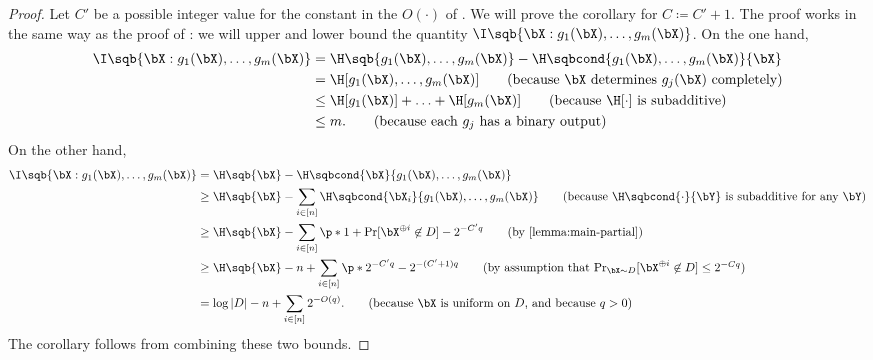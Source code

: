 \begin{proof}
Let $C'$ be a possible integer value for the constant in the $O(\cdot)$ of .
We will prove the corollary for $C \coloneqq C'+1$.
The proof works in the same way as the proof of : we will upper and lower bound the quantity $\I\sqb{\bX:g_1(\bX),\ldots, g_m(\bX)}$.
On the one hand,
\begin{align*}
\I\sqb{\bX:g_1(\bX), \ldots, g_m(\bX)}
&= \H\sqb{g_1(\bX), \ldots, g_m(\bX)} - \H\sqbcond{g_1(\bX), \ldots, g_m(\bX)}{\bX}\\
&= \H[g_1(\bX), \ldots, g_m(\bX)]\tag{because $\bX$ determines $g_j(\bX)$ completely}\\
&\leq \H[g_1(\bX)] + \ldots + \H[g_m(\bX)]\tag{because $\H[\cdot]$ is subadditive}\\
&\leq m.\tag{because each $g_j$ has a binary output}
\end{align*}
On the other hand,
\begin{align*}
\I\sqb{\bX:g_1(\bX), \ldots, g_m(\bX)}
&= \H\sqb{\bX} - \H\sqbcond{\bX}{g_1(\bX), \ldots, g_m(\bX)}\\
&\geq \H\sqb{\bX} - \sum_{i\in[n]}\H\sqbcond{\bX_i}{g_1(\bX), \ldots, g_m(\bX)}\tag{because $\H\sqbcond{\cdot}{\bY}$ is subadditive for any $\bY$}\\
&\geq \H\sqb{\bX} - \sum_{i\in[n]}\p*{1+\Pr[\bX^{\oplus i} \not\in D] - 2^{-C'q}}\tag{by \Cref{lemma:main-partial}}\\
&\geq \H\sqb{\bX} - n + \sum_{i\in[n]}\p*{2^{-C'q} - 2^{-(C'+1)q}}\tag{by assumption that $\Pr_{\bX \sim D}[\bX^{\oplus i} \not \in D] \leq 2^{-Cq}$}\\
&= \log|D| - n + \sum_{i\in[n]}2^{-O(q)}.\tag{because $\bX$ is uniform on $D$, and because $q>0$}
\end{align*}
The corollary follows from combining these two bounds.
\end{proof}

